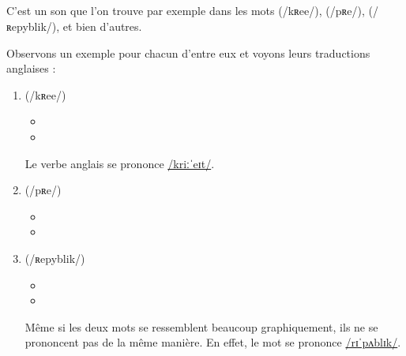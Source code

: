 \subsection{}\label{subsec:efr}

C'est un son que l'on trouve par exemple dans les mots 
(/kʀee/),  (/pʀe/),  (/ʀepyblik/), et bien d'autres.

Observons un exemple pour chacun d'entre eux et voyons leurs
traductions anglaises :\par

\begin{enumerate}
\item {} (/kʀee/)
  \begin{itemize}
  \item {}
    \item {}
    \end{itemize}
    Le verbe anglais  se prononce
    \href{https://en.oxforddictionaries.com/definition/create}{/kriːˈeɪt/}.
\item {} (/pʀe/)
  \begin{itemize}
  \item {}
  \item {}
  \end{itemize}
  

\item {} (/ʀepyblik/)
  \begin{itemize}
  \item {}
  \item {}
  \end{itemize}
  Même si les deux mots se ressemblent beaucoup graphiquement, ils
  ne se prononcent pas de la même manière. En effet, le mot
   se prononce \href{https://en.oxforddictionaries.com/definition/republic}{/rɪˈpʌblɪk/}. 
\end{enumerate}

  
\subsection{}\label{subsec:ɛfr}

